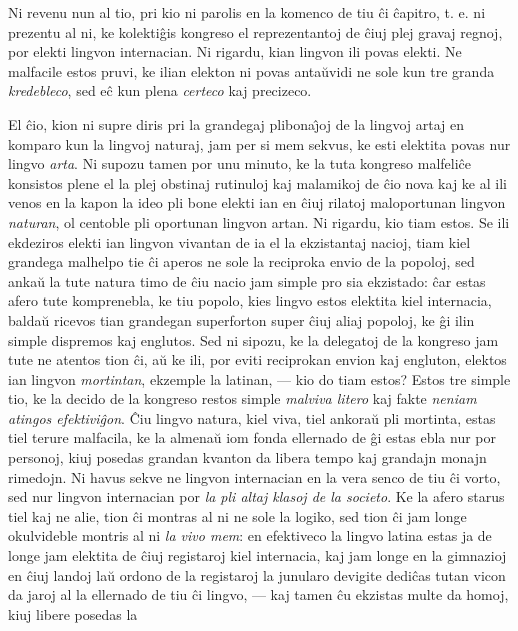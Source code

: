 \enlargethispage{-\baselineskip}
   Ni revenu nun al tio, pri kio ni parolis en la komenco de tiu
\^ci \^capitro, t. e. ni prezentu al ni, ke kolekti\^gis kongreso el
reprezentantoj de \^ciuj plej gravaj regnoj, por elekti lingvon
internacian. Ni rigardu, kian lingvon ili povas elekti. Ne malfacile
estos pruvi, ke ilian elekton ni povas anta\u uvidi ne sole kun tre
granda {\sl kredebleco}, sed e\^c kun plena {\sl certeco} kaj
precizeco.

   El \^cio, kion ni supre diris pri la grandegaj plibona\^{\j}oj de la
lingvoj artaj en komparo kun la lingvoj naturaj, jam per si mem
sekvus, ke esti elektita povas nur lingvo {\sl arta}. Ni supozu
tamen por unu minuto, ke la tuta kongreso malfeli\^ce konsistos
plene el la plej obstinaj rutinuloj kaj malamikoj de \^cio nova kaj
ke al ili venos en la kapon la ideo pli bone elekti ian en \^ciuj
rilatoj maloportunan lingvon {\sl naturan}, ol centoble pli
oportunan lingvon artan. Ni rigardu, kio tiam estos. Se ili
ekdeziros elekti ian lingvon vivantan de ia el la ekzistantaj
nacioj, tiam kiel grandega malhelpo tie \^ci aperos ne sole la
reciproka envio de la popoloj, sed anka\u u la tute natura timo de
\^ciu nacio jam simple pro sia ekzistado: \^car estas afero tute
komprenebla, ke tiu popolo, kies lingvo estos elektita kiel
internacia, balda\u u ricevos tian grandegan superforton super
\^ciuj aliaj popoloj, ke \^gi ilin simple dispremos kaj englutos.
Sed ni sipozu, ke la delegatoj de la kongreso jam tute ne atentos
tion \^ci, a\u u ke ili, por eviti reciprokan envion kaj engluton,
elektos ian lingvon {\sl mortintan}, ekzemple la latinan, --- kio do
tiam estos? Estos tre simple tio, ke la decido de la kongreso restos
simple {\sl malviva litero} kaj fakte {\sl neniam atingos
efektivi\^gon}. \^Ciu lingvo natura, kiel viva, tiel ankora\u u pli
mortinta, estas tiel terure malfacila, ke la almena\u u iom fonda
ellernado de \^gi estas ebla nur por personoj, kiuj posedas grandan
kvanton da libera tempo kaj grandajn monajn rimedojn. Ni havus sekve
ne lingvon internacian en la vera senco de tiu \^ci vorto, sed nur
lingvon internacian por {\sl la pli altaj klasoj de la societo}. Ke
la afero starus tiel kaj ne alie, tion \^ci montras al ni ne sole la
logiko, sed tion \^ci jam longe okulvideble montris al ni {\sl la
vivo mem}: en efektiveco la lingvo latina estas ja de longe jam
elektita de \^ciuj registaroj kiel internacia, kaj jam longe en la
gimnazioj en \^ciuj landoj la\u u ordono de la registaroj la
junularo devigite dedi\^cas tutan vicon da jaroj al la ellernado de
tiu \^ci lingvo,
--- kaj tamen \^cu ekzistas multe da homoj, kiuj libere posedas la
